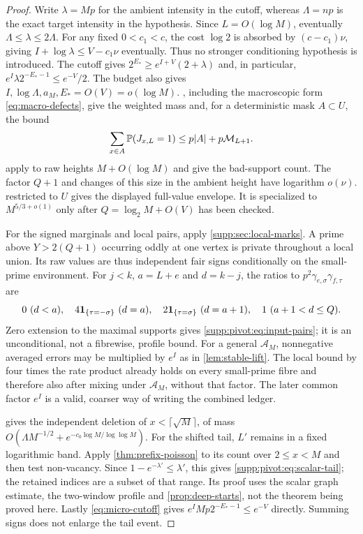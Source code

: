 \begin{proof}
Write $\lambda=Mp$ for the ambient intensity in the cutoff, whereas
$\Lambda=np$ is the exact target intensity in the hypothesis. Since
$L=O(\log M)$, eventually $\Lambda\le\lambda\le2\Lambda$.
For any fixed $0<c_1<c$, the cost $\log2$ is absorbed by
$(c-c_1)\nu$, giving $I+\log\lambda\le V-c_1\nu$ eventually.
Thus no stronger conditioning hypothesis is introduced. The cutoff gives
$2^{E_*}\ge e^{I+V}(2+\lambda)$ and, in particular,
$e^I\lambda2^{-E_*-1}\le e^{-V}/2$.
The budget also gives $I,\log\Lambda,a_M,E_*=O(V)=o(\log M)$.
, including the macroscopic form
\eqref{eq:macro-defects}, give the weighted mass and, for a deterministic
mask $A\subset U$, the bound
\[
 \sum_{x\in A}\mathbb P(J_{x,L}=1)
 \le p|A|+p\mathcal M_{L+1}.
\]
 apply to raw heights
$M+O(\log M)$ and give the bad-support count. The factor $Q+1$ and
changes of this size in the ambient height have logarithm $o(\nu)$.
 restricted to $U$ gives the displayed
full-value envelope. It is specialized to $M^{5/3+o(1)}$ only after
$Q=\log_2M+O(V)$ has been checked.

For the signed marginals and local pairs, apply
\cref{supp:sec:local-marks}. A prime above $Y>2(Q+1)$ occurring oddly at
one vertex is private throughout a local union. Its raw values are thus
independent fair signs conditionally on the small-prime environment.
For $j<k$, $a=L+e$ and $d=k-j$, the ratios to
$p^2\gamma_{e,\sigma}\gamma_{f,\tau}$ are
\[
 0\ (d<a),\quad4\1_{\{\tau=-\sigma\}}\ (d=a),\quad
 2\1_{\{\tau=\sigma\}}\ (d=a+1),\quad1\ (a+1<d\le Q).
\]
Zero extension to the maximal supports gives
\eqref{supp:pivot:eq:input-pairs}; it is an unconditional, not a
fibrewise, profile bound. For a general $\mathcal A_M$, nonnegative
averaged errors may be multiplied by $e^I$ as in
\cref{lem:stable-lift}. The local bound by four times the rate product
already holds on every small-prime fibre and therefore also after mixing
under $\mathcal A_M$, without that factor. The later common factor
$e^I$ is a valid, coarser way of writing the combined ledger.

 gives the independent deletion of
$x<\lceil\sqrt M\rceil$, of mass
$O(\Lambda M^{-1/2}+e^{-c_0\log M/\log\log M})$.
For the shifted tail, $L'$ remains in a fixed logarithmic band.
Apply \cref{thm:prefix-poisson} to its count over $2\le x<M$ and then
test non-vacancy. Since $1-e^{-\lambda'}\le\lambda'$, this gives
\eqref{supp:pivot:eq:scalar-tail}; the retained indices are a subset of
that range. Its proof uses the scalar graph estimate, the two-window
profile and \cref{prop:deep-starts}, not the theorem being proved here.
Lastly \eqref{eq:micro-cutoff} gives
$e^IMp2^{-E_*-1}\le e^{-V}$ directly. Summing signs does not enlarge
the tail event.
\end{proof}

